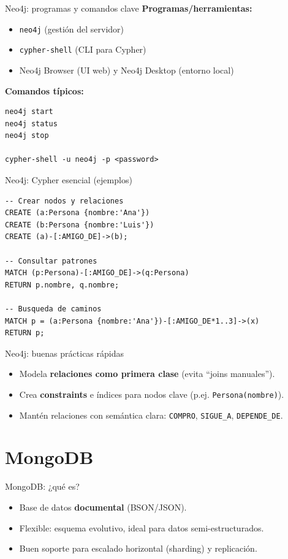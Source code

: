 \documentclass{beamer}
\begin{document}
\begin{frame}[fragile]{Neo4j: programas y comandos clave}
\textbf{Programas/herramientas:}
\begin{itemize}
  \item \texttt{neo4j} (gestión del servidor)
  \item \texttt{cypher-shell} (CLI para Cypher)
  \item Neo4j Browser (UI web) y Neo4j Desktop (entorno local)
\end{itemize}

\textbf{Comandos típicos:}
\begin{verbatim}
neo4j start
neo4j status
neo4j stop

cypher-shell -u neo4j -p <password>
\end{verbatim}
\end{frame}

\begin{frame}[fragile]{Neo4j: Cypher esencial (ejemplos)}
\begin{verbatim}
-- Crear nodos y relaciones
CREATE (a:Persona {nombre:'Ana'})
CREATE (b:Persona {nombre:'Luis'})
CREATE (a)-[:AMIGO_DE]->(b);

-- Consultar patrones
MATCH (p:Persona)-[:AMIGO_DE]->(q:Persona)
RETURN p.nombre, q.nombre;

-- Busqueda de caminos
MATCH p = (a:Persona {nombre:'Ana'})-[:AMIGO_DE*1..3]->(x)
RETURN p;
\end{verbatim}
\end{frame}

\begin{frame}{Neo4j: buenas prácticas rápidas}
\begin{itemize}
  \item Modela \textbf{relaciones como primera clase} (evita ``joins manuales'').
  \item Crea \textbf{constraints} e índices para nodos clave (p.ej. \texttt{Persona(nombre)}).
  \item Mantén relaciones con semántica clara: \texttt{COMPRO}, \texttt{SIGUE\_A}, \texttt{DEPENDE\_DE}.
\end{itemize}
\end{frame}

\section{MongoDB}

\begin{frame}{MongoDB: ¿qué es?}
\begin{itemize}
  \item Base de datos \textbf{documental} (BSON/JSON).
  \item Flexible: esquema evolutivo, ideal para datos semi-estructurados.
  \item Buen soporte para escalado horizontal (sharding) y replicación.
\end{itemize}
\end{frame}
\end{document}
